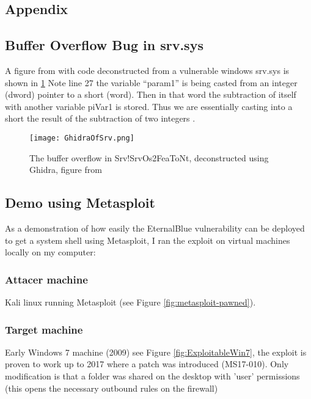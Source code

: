 \documentclass[
	letterpaper, %
	10pt, %
	unnumberedsections, %
	twoside, %
]{LTJournalArticle}
\begin{document}
\clearpage
\begin{appendices}
\onecolumn
\appendix
\section{Appendix} \label{Appendix}

\subsection{Buffer Overflow Bug in srv.sys}
A figure from \cite{h3xduck} with code deconstructed from a vulnerable windows srv.sys is shown in \ref{fig:Ghidra_srv.sys}
\newline
Note line 27 the variable “param1” is being casted from an integer (dword) pointer to a short (word). Then in that word the subtraction of itself with another variable piVar1 is stored. Thus we are essentially casting into a short the result of the subtraction of two integers \cite{h3xduck}.



\begin{figure}[ht] %
	\texttt{[image: GhidraOfSrv.png]}
	\caption{The buffer overflow in Srv!SrvOs2FeaToNt, deconstructed using Ghidra, figure from \cite{h3xduck}}
	\label{fig:Ghidra_srv.sys}
\end{figure}



\subsection{Demo using Metasploit}
As a demonstration of how easily the EternalBlue vulnerability can be deployed to get a system shell using Metasploit, I ran the exploit on virtual machines locally on my computer:
\subsubsection[short]{Attacer machine} Kali linux running Metasploit (see Figure \ref{fig:metasploit-pawned}).



\subsubsection[short]{Target machine}
Early Windows 7 machine (2009) see Figure \ref{fig:ExploitableWin7}, the exploit is proven to work up to 2017 where a patch was introduced (MS17-010).
Only modification is that a folder was shared on the desktop with 'user' permissions (this opens the necessary outbound rules on the firewall)


\end{appendices}
\end{document}
